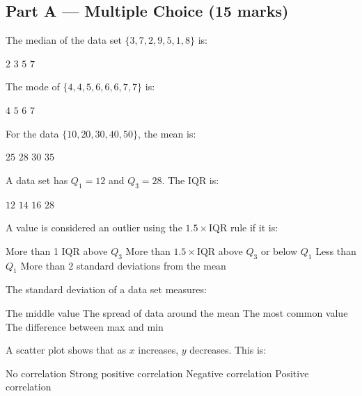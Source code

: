 \documentclass[addpoints]{exam}
\begin{document}
\newpage
\begin{questions}

\section*{Part A --- Multiple Choice (15 marks)}
\vspace{5mm}

\question[1] The median of the data set $\{3, 7, 2, 9, 5, 1, 8\}$ is:
\begin{choices}
    \choice $2$
    \choice $3$
    \correctchoice $5$
    \choice $7$
\end{choices}

\question[1] The mode of $\{4, 4, 5, 6, 6, 6, 7, 7\}$ is:
\begin{choices}
    \choice $4$
    \choice $5$
    \correctchoice $6$
    \choice $7$
\end{choices}

\question[1] For the data $\{10, 20, 30, 40, 50\}$, the mean is:
\begin{choices}
    \choice $25$
    \choice $28$
    \correctchoice $30$
    \choice $35$
\end{choices}

\question[1] A data set has $Q_1 = 12$ and $Q_3 = 28$. The IQR is:
\begin{choices}
    \choice $12$
    \choice $14$
    \correctchoice $16$
    \choice $28$
\end{choices}

\question[1] A value is considered an outlier using the $1.5 \times \text{IQR}$ rule if it is:
\begin{choices}
    \choice More than 1 IQR above $Q_3$
    \correctchoice More than $1.5 \times \text{IQR}$ above $Q_3$ or below $Q_1$
    \choice Less than $Q_1$
    \choice More than 2 standard deviations from the mean
\end{choices}

\question[1] The standard deviation of a data set measures:
\begin{choices}
    \choice The middle value
    \correctchoice The spread of data around the mean
    \choice The most common value
    \choice The difference between max and min
\end{choices}

\question[1] A scatter plot shows that as $x$ increases, $y$ decreases. This is:
\begin{choices}
    \choice No correlation
    \choice Strong positive correlation
    \correctchoice Negative correlation
    \choice Positive correlation
\end{choices}


\end{questions}
\end{document}
